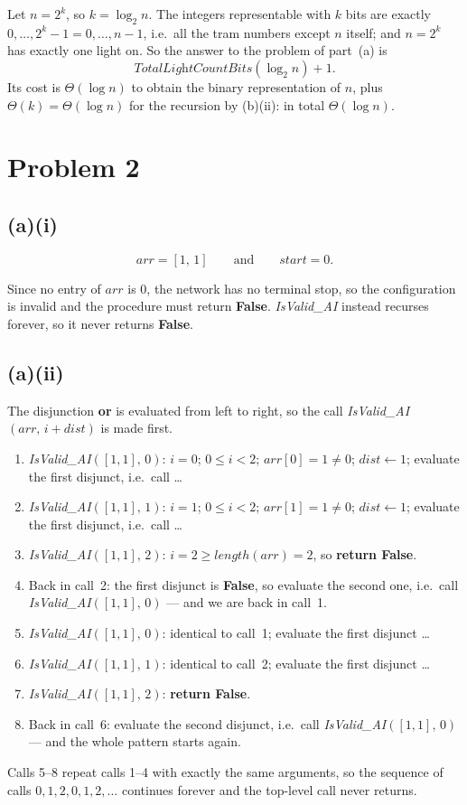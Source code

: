 \documentclass[11pt,a4paper]{article}
\newcommand{\id}[1]{\ensuremath{\mathit{#1}}}   %
\begin{document}
Let $n=2^{k}$, so $k=\log_2 n$. The integers representable with $k$ bits are exactly
$0,\dots,2^{k}-1=0,\dots,n-1$, i.e.\ all the tram numbers except $n$ itself; and $n=2^{k}$ has
exactly one light on. So the answer to the problem of part~(a) is
\[
\textit{TotalLightCountBits}(\log_2 n) + 1 .
\]
Its cost is $\Theta(\log n)$ to obtain the binary representation of $n$, plus
$\Theta(k)=\Theta(\log n)$ for the recursion by (b)(ii): in total $\Theta(\log n)$.
\section*{Problem 2}
\subsection*{(a)(i)}
\[
\id{arr}=[1,\,1]
\qquad\text{and}\qquad
\id{start}=0 .
\]

Since no entry of \id{arr} is $0$, the network has no terminal stop, so the configuration is
invalid and the procedure must return \textbf{False}. \textit{IsValid\_AI} instead recurses
forever, so it never returns \textbf{False}.

\subsection*{(a)(ii)}

The disjunction \textbf{or} is evaluated from left to right, so the call
\textit{IsValid\_AI}$(\id{arr},\,i+\id{dist})$ is made first.
\begin{enumerate}[label=\arabic*.,leftmargin=2.2em]
\item \textit{IsValid\_AI}$([1,1],\,0)$: $i=0$; $0\le i<2$; $\id{arr}[0]=1\neq 0$;
$\id{dist}\gets 1$; evaluate the first disjunct, i.e.\ call \dots
\item \textit{IsValid\_AI}$([1,1],\,1)$: $i=1$; $0\le i<2$; $\id{arr}[1]=1\neq 0$;
$\id{dist}\gets 1$; evaluate the first disjunct, i.e.\ call \dots
\item \textit{IsValid\_AI}$([1,1],\,2)$: $i=2\ge \id{length}(\id{arr})=2$, so
\textbf{return False}.
\item Back in call~2: the first disjunct is \textbf{False}, so evaluate the second one, i.e.\
call \textit{IsValid\_AI}$([1,1],\,0)$ --- and we are back in call~1.
\item \textit{IsValid\_AI}$([1,1],\,0)$: identical to call~1; evaluate the first disjunct \dots
\item \textit{IsValid\_AI}$([1,1],\,1)$: identical to call~2; evaluate the first disjunct \dots
\item \textit{IsValid\_AI}$([1,1],\,2)$: \textbf{return False}.
\item Back in call~6: evaluate the second disjunct, i.e.\ call
\textit{IsValid\_AI}$([1,1],\,0)$ --- and the whole pattern starts again.
\end{enumerate}
Calls 5--8 repeat calls 1--4 with exactly the same arguments, so the sequence of calls
$0,1,2,0,1,2,\dots$ continues forever and the top-level call never returns.
\end{document}
